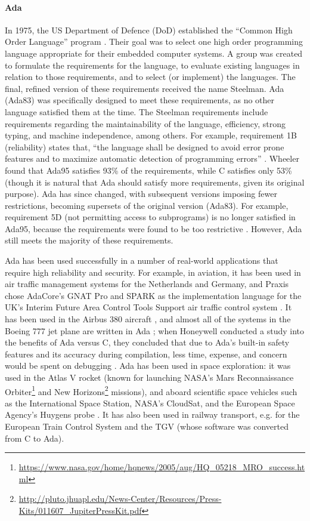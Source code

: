 \paragraph{Ada}
In 1975, the US Department of Defence (DoD) established the ``Common High Order Language'' program \cite{wheeler1997}.
Their goal was to select one high order programming language appropriate for their embedded computer systems.
A group was created to formulate the requirements for the language, to evaluate existing languages in relation to those requirements, and to select (or implement) the languages.
The final, refined version of these requirements received the name Steelman.
Ada (Ada83) was specifically designed to meet these requirements, as no other language satisfied them at the time.
The Steelman requirements include requirements regarding the maintainability of the language, efficiency, strong typing, and machine independence, among others.
For example, requirement 1B (reliability) states that, ``the language shall be designed to avoid error prone features and to maximize automatic detection of programming errors'' \cite{wheeler1997}.
Wheeler found that Ada95 satisfies 93\% of the requirements, while C satisfies only 53\% (though it is natural that Ada should satisfy more requirements, given its original purpose).
Ada has since changed, with subsequent versions imposing fewer restrictions, becoming supersets of the original version (Ada83).
For example, requirement 5D (not permitting access to subprograms) is no longer satisfied in Ada95, because the requirements were found to be too restrictive \cite{wheeler1997}.
However, Ada still meets the majority of these requirements.

Ada has been used successfully in a number of real-world applications that require high reliability and security.
For example, in aviation, it has been used in air traffic management systems for the Netherlands and Germany, and Praxis chose AdaCore's GNAT Pro and SPARK as the implementation language for the UK's Interim Future Area Control Tools Support air traffic control system \cite{adacore2007}.
It has been used in the Airbus 380 aircraft \cite{feldman2014}, and almost all of the systems in the Boeing 777 jet plane are written in Ada \cite{adaicBoeing}; when Honeywell conducted a study into the benefits of Ada versus C, they concluded that due to Ada's built-in safety features and its accuracy during compilation, less time, expense, and concern would be spent on debugging \cite{adaicBoeing}.
Ada has been used in space exploration: it was used in the Atlas V rocket (known for launching NASA's Mars Reconnaissance Orbiter\footnote{\url{https://www.nasa.gov/home/hqnews/2005/aug/HQ_05218_MRO_success.html}} and New Horizons\footnote{\url{http://pluto.jhuapl.edu/News-Center/Resources/Press-Kits/011607_JupiterPressKit.pdf}} missions), and aboard scientific space vehicles such as the International Space Station, NASA's CloudSat, and the European Space Agency's Huygens probe \cite{feldman2014}.
It has also been used in railway transport, e.g. for the European Train Control System and the TGV (whose software was converted from C to Ada).

